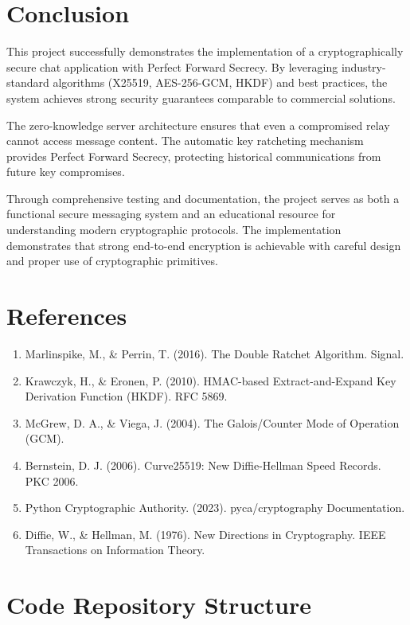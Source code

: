 \documentclass[12pt,a4paper]{article}
\begin{document}
\section{Conclusion}

This project successfully demonstrates the implementation of a cryptographically secure chat application with Perfect Forward Secrecy. By leveraging industry-standard algorithms (X25519, AES-256-GCM, HKDF) and best practices, the system achieves strong security guarantees comparable to commercial solutions.

The zero-knowledge server architecture ensures that even a compromised relay cannot access message content. The automatic key ratcheting mechanism provides Perfect Forward Secrecy, protecting historical communications from future key compromises.

Through comprehensive testing and documentation, the project serves as both a functional secure messaging system and an educational resource for understanding modern cryptographic protocols. The implementation demonstrates that strong end-to-end encryption is achievable with careful design and proper use of cryptographic primitives.

\section{References}

\begin{enumerate}
    \item Marlinspike, M., \& Perrin, T. (2016). The Double Ratchet Algorithm. Signal.
    \item Krawczyk, H., \& Eronen, P. (2010). HMAC-based Extract-and-Expand Key Derivation Function (HKDF). RFC 5869.
    \item McGrew, D. A., \& Viega, J. (2004). The Galois/Counter Mode of Operation (GCM).
    \item Bernstein, D. J. (2006). Curve25519: New Diffie-Hellman Speed Records. PKC 2006.
    \item Python Cryptographic Authority. (2023). pyca/cryptography Documentation.
    \item Diffie, W., \& Hellman, M. (1976). New Directions in Cryptography. IEEE Transactions on Information Theory.
\end{enumerate}

\appendix
\section{Code Repository Structure}
\end{document}
